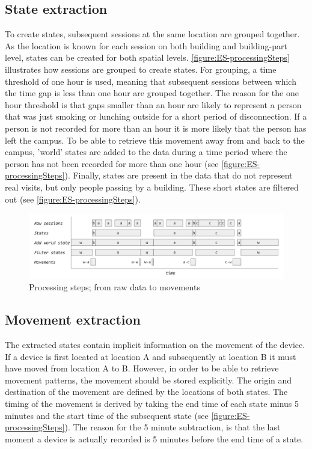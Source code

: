 \subsection{State extraction}\label{ES-stateExtraction}
To create states, subsequent sessions at the same location are grouped together. As the location is known for each session on both building and building-part level, states can be created for both spatial levels. \autoref{figure:ES-processingSteps} illustrates how sessions are grouped to create states. For grouping, a time threshold of one hour is used, meaning that subsequent sessions between which the time gap is less than one hour are grouped together. The reason for the one hour threshold is that gaps smaller than an hour are likely to represent a person that was just smoking or lunching outside for a short period of disconnection. If a person is not recorded for more than an hour it is more likely that the person has left the campus. To be able to retrieve this movement away from and back to the campus, 'world' states are added to the data during a time period where the person has not been recorded for more than one hour (see \autoref{figure:ES-processingSteps}). Finally, states are present in the data that do not represent real visits, but only people passing by a building. These short states are filtered out (see \autoref{figure:ES-processingSteps}). 

\begin{figure}[H]
\centering
\includegraphics[scale=0.15]{ES-processingSteps}
\captionsetup{justification=centering}
\caption{Processing steps; from raw data to movements}
\label{figure:ES-processingSteps}
\end{figure}

\subsection{Movement extraction}\label{ES-movementExtraction}
The extracted states contain implicit information on the movement of the device. If a device is first located at location A and subsequently at location B it must have moved from location A to B. However, in order to be able to retrieve movement patterns, the movement should be stored explicitly. The origin and destination of the movement are defined by the locations of both states. The timing of the movement is derived by taking the end time of each state minus 5 minutes and the start time of the subsequent state (see \autoref{figure:ES-processingSteps}). The reason for the 5 minute subtraction, is that the last moment a device is actually recorded is 5 minutes before the end time of a state.  

